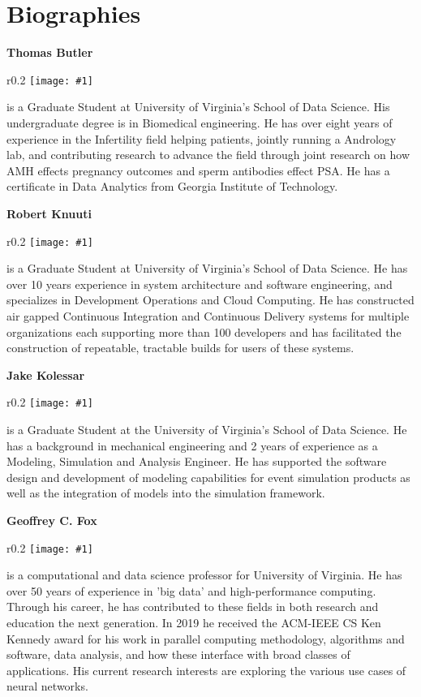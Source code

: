 \documentclass[sigplan,screen]{acmart}
\newcommand{\BIOFIG}[3]{%
\parindent 0pt%
\setlength{\intextsep}{6pt}%
\setlength{\columnsep}{6pt}%

{\bf #2}

\begin{wrapfigure}{r}{0.2\columnwidth}%
    \texttt{[image: \#1]}%
\end{wrapfigure}%
#3%
}
\begin{document}
%
%






\section*{Biographies}

\BIOFIG{images/bio/tom.png}{Thomas Butler}{is a Graduate Student at
  University of Virginia's School of Data Science. His undergraduate
  degree is in Biomedical engineering. He has over eight years of
  experience in the Infertility field helping patients, jointly
  running a Andrology lab, and contributing research to advance the
  field through joint research on how AMH effects pregnancy outcomes
  and sperm antibodies effect PSA. He has a certificate in Data
  Analytics from Georgia Institute of Technology.}

\BIOFIG{images/bio/rob.png}{Robert Knuuti}{is a Graduate Student at
  University of Virginia's School of Data Science. He has over 10
  years experience in system architecture and software engineering,
  and specializes in Development Operations and Cloud Computing. He
  has constructed air gapped Continuous Integration and Continuous
  Delivery systems for multiple organizations each supporting more
  than 100 developers and has facilitated the construction of
  repeatable, tractable builds for users of these systems.}

\BIOFIG{images/bio/gregor.png}{Jake Kolessar}{is a Graduate Student at
  the University of Virginia's School of Data Science. He has a
  background in mechanical engineering and 2 years of experience as a
  Modeling, Simulation and Analysis Engineer. He has supported the
  software design and development of modeling capabilities for event
  simulation products as well as the integration of models into the
  simulation framework.}

\BIOFIG{images/bio/fox.png}{Geoffrey C. Fox}{is a computational and data 
  science professor for University of Virginia. He has over 50 years of 
  experience in 'big data' and high-performance computing. Through his 
  career, he has contributed to these fields in both research and education 
  the next generation. In 2019 he received the ACM-IEEE CS Ken Kennedy 
  award for his work in parallel computing methodology, algorithms and 
  software, data analysis, and how these interface with broad classes of 
  applications. His current research interests are exploring the various 
  use cases of neural networks.}
\end{document}
